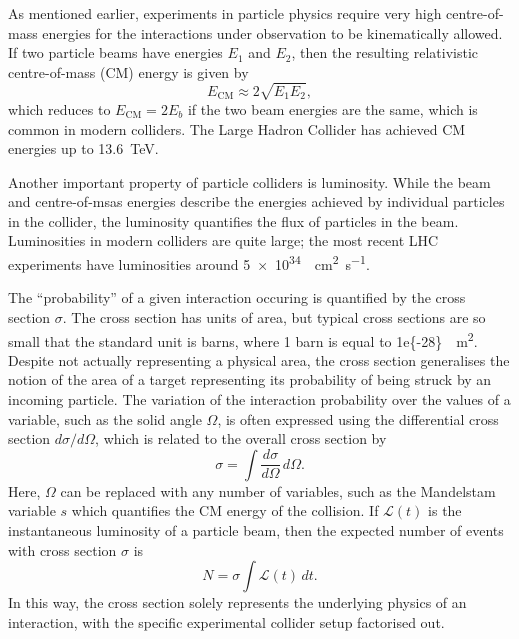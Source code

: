 \documentclass[12pt,a4paper]{report}
\begin{document}
As mentioned earlier, experiments in particle physics require very high centre-of-mass energies for the interactions under observation to be kinematically allowed. If two particle beams have energies $E_1$ and $E_2$, then the resulting relativistic centre-of-mass (CM) energy is given by
\begin{equation}
  E_\text{CM} \approx 2 \sqrt{E_1 E_2},
\end{equation}
which reduces to $E_\text{CM}=2E_b$ if the two beam energies are the same, which is common in modern colliders. The Large Hadron Collider has achieved CM energies up to \qty{13.6}{\tera\electronvolt}.

Another important property of particle colliders is luminosity. While the beam and centre-of-msas energies describe the energies achieved by individual particles in the collider, the luminosity quantifies the flux of particles in the beam. Luminosities in modern colliders are quite large; the most recent LHC experiments have luminosities around \qty{5e34}{\per\square\centi\meter\per\second}.

The ``probability'' of a given interaction occuring is quantified by the cross section $\sigma$. The cross section has units of area, but typical cross sections are so small that the standard unit is barns, where 1 barn is equal to \qty{1e{-28}}{\per\square\meter}. Despite not actually representing a physical area, the cross section generalises the notion of the area of a target representing its probability of being struck by an incoming particle. The variation of the interaction probability over the values of a variable, such as the solid angle $\Omega$, is often expressed using the differential cross section $d\sigma / d\Omega$, which is related to the overall cross section by
\begin{equation}
  \sigma = \int \frac{d\sigma}{d\Omega} \, d\Omega.
\end{equation}
Here, $\Omega$ can be replaced with any number of variables, such as the Mandelstam variable $s$ which quantifies the CM energy of the collision. If $\mathcal{L}(t)$ is the instantaneous luminosity of a particle beam, then the expected number of events with cross section $\sigma$ is
\begin{equation}
  N = \sigma \int \mathcal{L}(t) \, dt.
\end{equation}
In this way, the cross section solely represents the underlying physics of an interaction, with the specific experimental collider setup factorised out.
\end{document}

